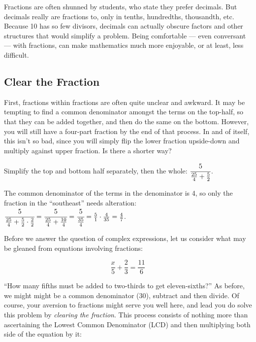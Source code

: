 


Fractions are often shunned by students, who state they prefer decimals.  But decimals really
are fractions to, only in tenths, hundredths, thousandth, etc.  Because 10 has so few divisors,
decimals can actually obscure factors and other structures that would simplify a problem.  
Being comfortable --- even conversant --- with fractions, can make mathematics much more
enjoyable, or at least, less difficult.

\subsection{Clear the Fraction}
First, fractions within fractions are often quite unclear and awkward.  It may be tempting to
find a common denominator amongst the terms on the top-half, so that they can be
added together, and then do the same on the bottom.  However, you will still have a four-part
fraction by the end of that process.  In and of itself, this isn't so bad, since you will simply 
flip the lower fraction upside-down and multiply against upper fraction.  Is there a shorter way?

\begin{example}
	\exProblem
Simplify the top and bottom half separately, then the whole: $\cfrac{5}{\frac{25}{4}+\frac{5}{2}}$.

\exSolution
The common denominator of the terms in the denominator is 4, so only the fraction in the
``southeast'' needs alteration: $\cfrac{5}{\frac{25}{4}+\frac{5}{2}\cdot\frac{2}{2}} = 
\cfrac{5}{\frac{25}{4}+\frac{10}{4}} = \cfrac{5}{\frac{35}{4}} = \frac{5}{1}\cdot\frac{4}{35}
=\frac{4}{7}$.
\end{example}

Before we answer the question of complex expressions, let us consider what may be
gleaned from equations involving fractions:

\begin{equation}
\frac{x}{5}+\frac{2}{3}=\frac{11}{6}
\end{equation}

``How many fifths must be added to two-thirds to get eleven-sixths?''  As before, we might might
be a common denominator (30), subtract and then divide.  Of course, your aversion to fractions
might serve you well here, and lead you do solve this problem by \emph{clearing the fraction}.
This process consists of nothing more than ascertaining the Lowest Common Denominator (LCD)
and then multiplying both side of the equation by it:

